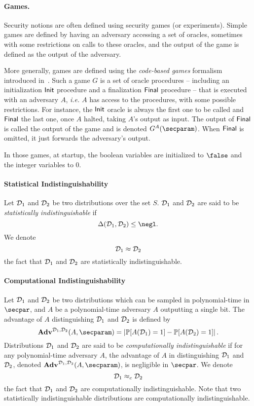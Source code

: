 \paragraph{Games.} %
\label{par:def_games}

Security notions are often defined using security games (or experiments).
Simple games are defined by having an adversary accessing a set of oracles, sometimes with some restrictions on calls to these oracles, and the output of the game is defined as the output of the adversary.

More generally, games are defined using the \emph{code-based games} formalism introduced in~\cite{EC:BelRog06}.
Such a game $G$ is a set of oracle procedures -- including an initialization $\mathsf{Init}$ procedure and a finalization $\mathsf{Final}$ procedure -- that is executed with an adversary $A$, \emph{i.e.} $A$ has access to the procedures, with some possible restrictions. 
For instance, the $\mathsf{Init}$ oracle is always the first one to be called and $\mathsf{Final}$ the last one, once $A$ halted, taking $A$'s output as input. The output of $\mathsf{Final}$ is called the output of the game and is denoted $G^A(\secparam)$. When $\mathsf{Final}$ is omitted, it just forwards the adversary's output. 
		
In those games, at startup, the boolean variables are initialized to $\false$ and the integer variables to $0$.


\paragraph{Statistical Indistinguishability} %
\label{par:def_stat_ind}

Let $\mathcal{D}_1$ and $\mathcal{D}_2$ be two distributions over the set $S$.
$\mathcal{D}_1$ and $\mathcal{D}_2$ are said to be \emph{statistically indistinguishable} if 
\[
	\Delta(\cD_1,\cD_2) \leq \negl.
\] 
We denote
\[
	\mathcal{D}_1 \approx \mathcal{D}_2
\]
the fact that $\mathcal{D}_1$ and $\mathcal{D}_2$ are statistically indistinguishable.



\paragraph{Computational Indistinguishability} %
\label{par:def_comp_ind}

Let $\mathcal{D}_1$ and $\mathcal{D}_2$ be two distributions which can be sampled in polynomial-time in $\secpar$, and $A$ be a polynomial-time adversary $A$ outputting a single bit. 
The advantage of $A$ distinguishing $\mathcal{D}_1$ and $\mathcal{D}_2$ is defined by
\[
	\Adv^{\cD_1, \cD_2}(A,\secparam) = \left| \Prob[A(\cD_1) = 1] - \Prob[A(\cD_2) = 1] \right|.
\]
Distributions $\mathcal{D}_1$ and $\mathcal{D}_2$ are said to be \emph{computationally indistinguishable} if for any polynomial-time adversary $A$, the advantage of $A$ in distinguishing $\mathcal{D}_1$ and $\mathcal{D}_2$, denoted $\Adv^{\cD_1, \cD_2}(A,\secparam)$, is negligible in $\secpar$.
We denote
\[
	\mathcal{D}_1 \approx_c \mathcal{D}_2
\]
the fact that $\mathcal{D}_1$ and $\mathcal{D}_2$ are computationally indistinguishable.
Note that two statistically indistinguishable distributions are computationally indistinguishable.

